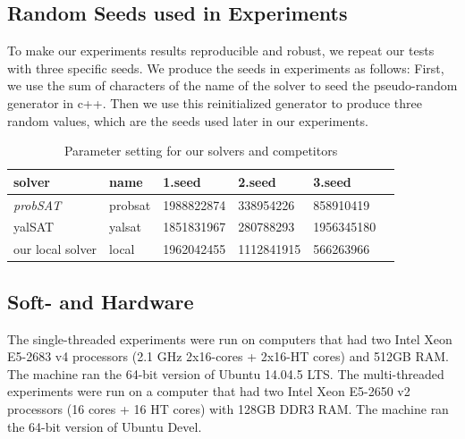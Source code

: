 \documentclass[12pt,a4paper,twoside]{scrartcl}
\numberwithin{equation}{section}
\begin{document}
\subsection{Random Seeds used in Experiments}
\label{sec:seed}
To make our experiments results reproducible and robust, we repeat our tests with three specific seeds. We produce the seeds in experiments as follows: First, we use the sum of characters of the name of the solver to seed the pseudo-random generator in c++.  Then we use this reinitialized generator to produce three random values, which are the seeds used later in our experiments. 
\begin{table}[h!]
\begin{center}
    \begin{tabular}{|l|l|l|l|l|p{1cm}|}
\hline 
    solver&name&1.seed&2.seed&3.seed \\ \hline
	\emph{probSAT}&probsat&1988822874&338954226 &858910419 \\ \hline
	yalSAT &yalsat&1851831967&280788293&1956345180 \\ \hline
	our local solver & local&1962042455&1112841915&566263966 \\ \hline
	
\end{tabular}
\caption[probSAT]{Parameter setting for our solvers and competitors}
\end{center}
\end{table} 
\subsection{Soft- and Hardware}
The single-threaded experiments were run on computers that had two Intel Xeon E5-2683 v4 processors  (2.1 GHz 2x16-cores + 2x16-HT cores) and 512GB RAM. The machine ran the 64-bit version
of  Ubuntu 14.04.5 LTS. The multi-threaded experiments were run on a computer that had two Intel Xeon E5-2650 v2 processors (16 cores + 16 HT cores) with 128GB DDR3 RAM. The machine ran the 64-bit version of Ubuntu Devel. 
\clearpage
\end{document}
